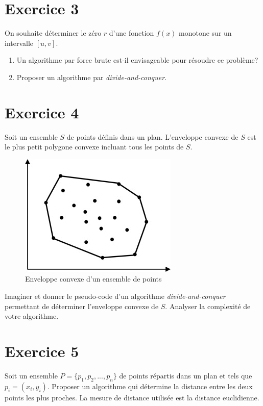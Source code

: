 \documentclass[a4paper,10pt]{article}
\begin{document}
\section*{Exercice 3}

On souhaite déterminer le zéro $r$ d'une fonction $f(x)$ monotone sur un intervalle $[u, v]$.

\begin{enumerate}
\item Un algorithme par force brute est-il envisageable pour résoudre ce problème?
\item Proposer un algorithme par \textit{divide-and-conquer}.
\end{enumerate}


\section*{Exercice 4}

Soit un ensemble $S$ de points définis dans un plan. L'enveloppe convexe de $S$
est le plus petit polygone convexe incluant tous les points de $S$.

\begin{figure}[h]
    \center
    \includegraphics[scale=1.0]{convexhull.jpg}
    \caption{Enveloppe convexe d'un ensemble de points}
\end{figure}

Imaginer et donner le pseudo-code d'un algorithme \textit{divide-and-conquer}
permettant de déterminer l'enveloppe convexe de $S$. Analyser la complexité de votre
algorithme.


\section*{Exercice 5}

Soit un ensemble $P = \{p_1, p_2, ..., p_n\}$ de points répartis dans un plan et tels que $p_i = (x_i, y_i)$. Proposer un algorithme qui détermine la distance entre les deux points les plus proches. La mesure de distance utilisée est la distance euclidienne.
\end{document}
